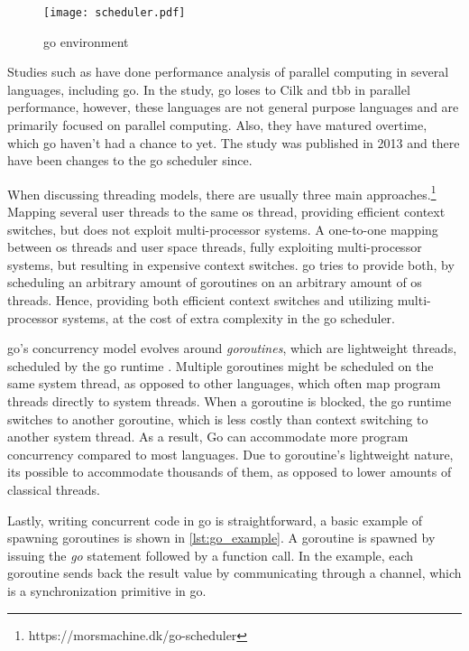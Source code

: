 \documentclass[USenglish]{uit-thesis}
\begin{document}
\begin{figure}[h]
	\centering
	\texttt{[image: scheduler.pdf]}
	\caption{\gls{go} environment}
	\label{go_structure}
\end{figure}

Studies such as \cite{go_bench} have done performance analysis of parallel computing in several languages, including \gls{go}.
In the study, \gls{go} loses to Cilk\cite{cilk} and \gls{tbb}\cite{tbb} in parallel performance, however, these languages are not general purpose languages and are primarily focused on parallel computing.
Also, they have matured overtime, which \gls{go} haven't had a chance to yet.
The study was published in 2013 and there have been changes to the \gls{go} scheduler since.

When discussing threading models, there are usually three main approaches.\footnote{https://morsmachine.dk/go-scheduler}
Mapping several user threads to the same \gls{os} thread, providing efficient context switches, but does not exploit multi-processor systems.
A one-to-one mapping between \gls{os} threads and user space threads, fully exploiting multi-processor systems, but resulting in expensive context switches.
\gls{go} tries to provide both, by scheduling an arbitrary amount of goroutines on an arbitrary amount of \gls{os} threads. 
Hence, providing both efficient context switches and utilizing multi-processor systems, at the cost of extra complexity in the \gls{go} scheduler.

\gls{go}'s concurrency model evolves around \textit{goroutines}, which are lightweight threads, scheduled by the go runtime \cite{go}.
Multiple goroutines might be scheduled on the same system thread, as opposed to other languages, which often map program threads directly to system threads.
When a goroutine is blocked, the go runtime switches to another goroutine, which is less costly than context switching to another system thread.
As a result, Go can accommodate more program concurrency compared to most languages.
Due to goroutine's lightweight nature, its possible to accommodate thousands of them, as opposed to lower amounts of classical threads. 


Lastly, writing concurrent code in \gls{go} is straightforward, a basic example of spawning goroutines is shown in \autoref{lst:go_example}.
A goroutine is spawned by issuing the \textit{go} statement followed by a function call.
In the example, each goroutine sends back the result value by communicating through a channel, which is a synchronization primitive in \gls{go}.
\end{document}
